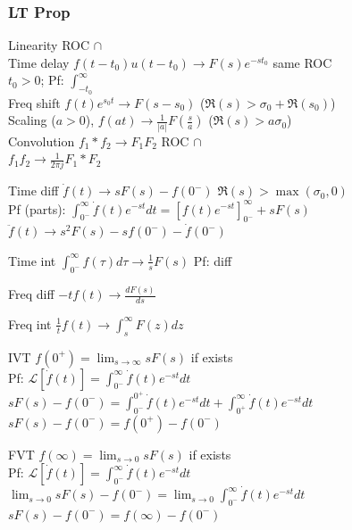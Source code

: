 \documentclass[4pt]{article}
\theoremstyle{definition}
\theoremstyle{definition}
\newcommand{\ra}{\rightarrow}
\newcommand{\ulint}{\int_{0^-}^{\infty}}    %
\begin{document}
\begin{landscape}
\begin{multicols}{3}
\subsubsection*{LT Prop}
    Linearity \hfill ROC $\cap$\\
    Time delay \(f(t-t_0) u(t-t_0) \ra F(s) e^{-st_0}\)  \hfill same ROC\\    %
        $t_0 > 0$; Pf: \(\int_{-t_0}^{\infty}\)\\ %
    Freq shift \(f(t) e^{s_0 t} \ra F(s-s_0)\) ($\Re(s) > \sigma_0 + \Re(s_0)$)\\
    Scaling ($a > 0$), \(f(at) \ra \frac{1}{|a|} F(\frac{s}{a})\) ($\Re(s) > a\sigma_0 $)\\   %
    Convolution \(f_1 * f_2 \ra F_1 F_2\) \hfill ROC $\cap$\\
    \(f_1 f_2 \ra \frac{1}{2\pi j} F_1 * F_2\)

    Time diff \(\dot{f}(t) \ra sF(s) - f(0^-)\) \hfill $\Re(s) > \max(\sigma_0, 0)$\\     %
        Pf (parts): \(\ulint \dot{f}(t) e^{-st} dt = \left[f(t) e^{-st} \right]^{\infty}_{0^-} + s F(s)\)\\    %
    \(\ddot{f}(t) \ra s^2 F(s) - sf(0^-) - \dot{f}(0^-)\)   %

    Time int \(\ulint f(\tau) d\tau \ra \frac{1}{s} F(s)\) Pf: diff     %

    Freq diff \(-t f(t) \ra \frac{dF(s)}{ds}\)          %

    Freq int \(\frac{1}{t}f(t) \ra \int_s^{\infty}F(z) dz\)

    IVT \(f(0^+) = \lim_{s\ra \infty} sF(s)\) if exists\\
        Pf: \(\mathcal L[\dot{f} (t)] = \ulint \dot f(t) e^{-st} dt\)\\ %
        \(sF(s) - f(0^-) = \int_{0^-}^{0^+} \dot f (t) e^{-st} dt + \int _{0^+}^{\infty} \dot f(t) e^{-st} dt \)\\    %
        \(sF(s) - f(0^-) = f(0^+) - f(0^-)\)    %

    FVT \(f(\infty) = \lim_{s\ra 0} sF(s)\) if exists\\
        Pf: \(\mathcal L[\dot{f} (t)] = \ulint \dot f(t) e^{-st} dt\)\\ %
        \(\lim_{s\ra 0} sF(s) - f(0^-) = \lim_{s\ra 0}\ulint \dot f (t) e^{-st} dt\)\\    %
        \(sF(s) - f(0^-) = f(\infty) - f(0^-)\)    %

\end{multicols}
\end{landscape}
\end{document}
